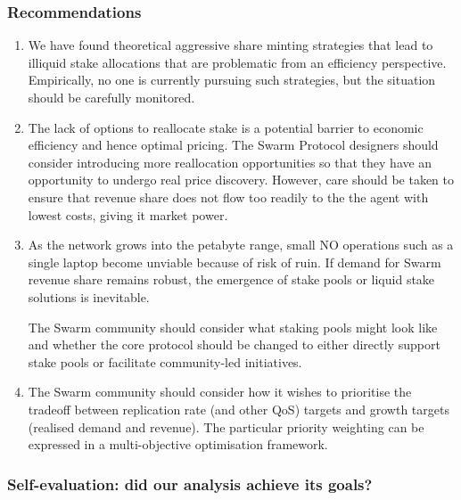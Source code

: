 \subsubsection{Recommendations}
\label{section:recommendations}

\begin{enumerate}
  \item
    We have found theoretical aggressive share minting strategies that lead to illiquid stake allocations that are problematic from an efficiency perspective.
    Empirically, no one is currently pursuing such strategies, but the situation should be carefully monitored.

  \item
    The lack of options to reallocate stake is a potential barrier to economic efficiency and hence optimal pricing.
    The Swarm Protocol designers should consider introducing more reallocation opportunities so that they have an opportunity to undergo real price discovery.
    However, care should be taken to ensure that revenue share does not flow too readily to the the agent with lowest costs, giving it market power.
    
  \item
    As the network grows into the petabyte range, small NO operations such as a single laptop become unviable because of risk of ruin.
    If demand for Swarm revenue share remains robust, the emergence of stake pools or liquid stake solutions is inevitable.

    The Swarm community should consider what staking pools might look like and whether the core protocol should be changed to either directly support stake pools or facilitate community-led initiatives.


  \item
    The Swarm community should consider how it wishes to prioritise the tradeoff between replication rate (and other QoS) targets and growth targets (realised demand and revenue).
    The particular priority weighting can be expressed in a multi-objective optimisation framework.

\end{enumerate}

\subsubsection{Self-evaluation: did our analysis achieve its goals?}

